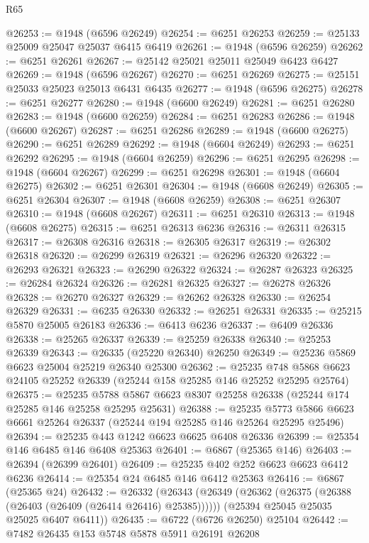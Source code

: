 \begin{lexlean}{R65}
\begin{coremodule}
{@26253 := @1948 (@6596 @26249)
@26254 := @6251 @26253
@26259 := @25133 @25009 @25047 @25037 @6415 @6419
@26261 := @1948 (@6596 @26259)
@26262 := @6251 @26261
@26267 := @25142 @25021 @25011 @25049 @6423 @6427
@26269 := @1948 (@6596 @26267)
@26270 := @6251 @26269
@26275 := @25151 @25033 @25023 @25013 @6431 @6435
@26277 := @1948 (@6596 @26275)
@26278 := @6251 @26277
@26280 := @1948 (@6600 @26249)
@26281 := @6251 @26280
@26283 := @1948 (@6600 @26259)
@26284 := @6251 @26283
@26286 := @1948 (@6600 @26267)
@26287 := @6251 @26286
@26289 := @1948 (@6600 @26275)
@26290 := @6251 @26289
@26292 := @1948 (@6604 @26249)
@26293 := @6251 @26292
@26295 := @1948 (@6604 @26259)
@26296 := @6251 @26295
@26298 := @1948 (@6604 @26267)
@26299 := @6251 @26298
@26301 := @1948 (@6604 @26275)
@26302 := @6251 @26301
@26304 := @1948 (@6608 @26249)
@26305 := @6251 @26304
@26307 := @1948 (@6608 @26259)
@26308 := @6251 @26307
@26310 := @1948 (@6608 @26267)
@26311 := @6251 @26310
@26313 := @1948 (@6608 @26275)
@26315 := @6251 @26313 @6236
@26316 := @26311 @26315
@26317 := @26308 @26316
@26318 := @26305 @26317
@26319 := @26302 @26318
@26320 := @26299 @26319
@26321 := @26296 @26320
@26322 := @26293 @26321
@26323 := @26290 @26322
@26324 := @26287 @26323
@26325 := @26284 @26324
@26326 := @26281 @26325
@26327 := @26278 @26326
@26328 := @26270 @26327
@26329 := @26262 @26328
@26330 := @26254 @26329
@26331 := @6235 @26330
@26332 := @26251 @26331
@26335 := @25215 @5870 @25005 @26183
@26336 := @6413 @6236
@26337 := @6409 @26336
@26338 := @25265 @26337
@26339 := @25259 @26338
@26340 := @25253 @26339
@26343 := @26335 (@25220 @26340) @26250
@26349 := @25236 @5869 @6623 @25004 @25219 @26340 @25300
@26362 := @25235
    @748
    @5868
    @6623
    @24105
    @25252
    @26339
    (@25244 @158 @25285 @146 @25252 @25295 @25764)
@26375 := @25235
    @5788
    @5867
    @6623
    @8307
    @25258
    @26338
    (@25244 @174 @25285 @146 @25258 @25295 @25631)
@26388 := @25235
    @5773
    @5866
    @6623
    @6661
    @25264
    @26337
    (@25244 @194 @25285 @146 @25264 @25295 @25496)
@26394 := @25235 @443 @1242 @6623 @6625 @6408 @26336
@26399 := @25354 @146 @6485 @146 @6408 @25363
@26401 := @6867 (@25365 @146)
@26403 := @26394 (@26399 @26401)
@26409 := @25235 @402 @252 @6623 @6623 @6412 @6236
@26414 := @25354 @24 @6485 @146 @6412 @25363
@26416 := @6867 (@25365 @24)
@26432 := @26332
    (@26343
      (@26349 (@26362 (@26375 (@26388 (@26403 (@26409 (@26414 @26416) @25385))))))
      (@25394 @25045 @25035 @25025 @6407 @6411))
@26435 := @6722 (@6726 @26250) @25104
@26442 := @7482 @26435 @153 @5748 @5878 @5911 @26191 @26208
}
\end{coremodule}
\end{lexlean}
